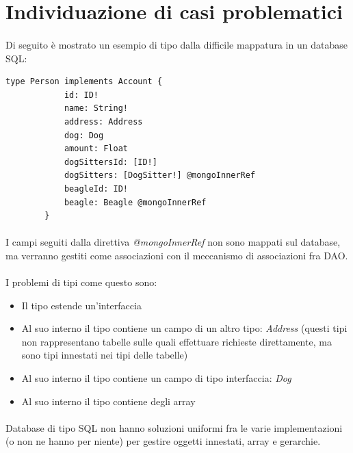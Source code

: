 \documentclass[a4paper, 12pt]{report}
\begin{document}
    \section{Individuazione di casi problematici}
    \paragraph*{}
    Di seguito è mostrato un esempio di tipo dalla difficile mappatura in un database SQL:
        \hypertarget{tipo-difficile}{}\begin{Verbatim}[samepage=true]
        type Person implements Account {
            id: ID!
            name: String!
            address: Address
            dog: Dog
            amount: Float
            dogSittersId: [ID!]
            dogSitters: [DogSitter!] @mongoInnerRef
            beagleId: ID!
            beagle: Beagle @mongoInnerRef
        }
      \end{Verbatim}
      \paragraph*{}
      I campi seguiti dalla direttiva \emph{@mongoInnerRef} non sono mappati sul database, ma verranno gestiti come associazioni con il meccanismo di associazioni fra DAO.
      \paragraph*{}
      I problemi di tipi come questo sono:
      \begin{itemize}
        \item Il tipo estende un'interfaccia
        \item Al suo interno il tipo contiene un campo di un altro tipo: \emph{Address} (questi tipi non rappresentano tabelle sulle quali effettuare richieste direttamente, ma sono tipi innestati nei tipi delle tabelle)
        \item Al suo interno il tipo contiene un campo di tipo interfaccia: \emph{Dog}
        \item Al suo interno il tipo contiene degli array
      \end{itemize}
      \paragraph*{}
      Database di tipo SQL non hanno soluzioni uniformi fra le varie implementazioni (o non ne hanno per niente) per gestire oggetti innestati, array e gerarchie.
\end{document}
